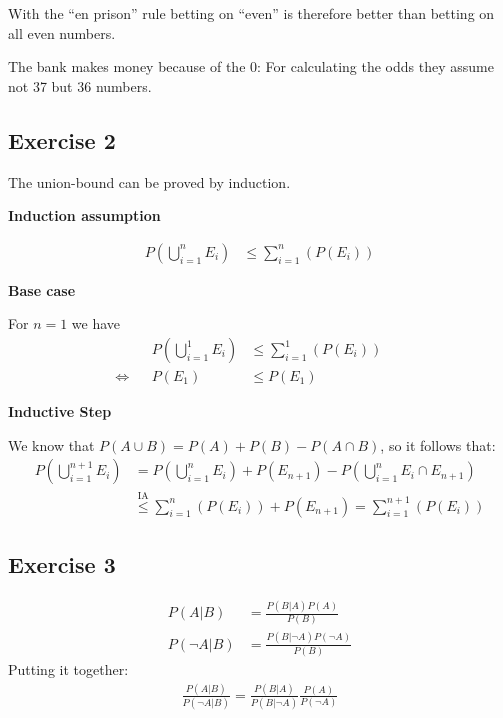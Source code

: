 With the ``en prison'' rule betting on ``even'' is therefore better than betting on all even numbers.

\bigskip

The bank makes money because of the $0$: For calculating the odds they assume not 37 but 36 numbers.


\subsection*{Exercise 2}
\setcounter{equation}{0}
The union-bound can be proved by induction.

\bigskip

\begin{samepage}
\textbf{Induction assumption}

\begin{align}
& & P\left(\bigcup\limits_{i=1}^{n}E_i\right) & \leq \sum\limits_{i=1}^{n}(P(E_i)) & &
\end{align}
\end{samepage}

\begin{samepage}
\textbf{Base case}

For $n=1$ we have
\begin{align}
& & P\left(\bigcup\limits_{i=1}^{1}E_i\right) & \leq \sum\limits_{i=1}^{1}(P(E_i)) & & \\
\Leftrightarrow & & P(E_1) & \leq P(E_1) & & 
\end{align}
\end{samepage}

\begin{samepage}
\textbf{Inductive Step}

We know that $P(A \cup B) = P(A) + P(B) - P(A \cap B)$, so it follows that:
\begin{align}
P\left(\bigcup\limits_{i=1}^{n+1}E_i\right) &= P\left(\bigcup\limits_{i=1}^{n}E_i\right) + P(E_{n+1}) - P\left(\bigcup\limits_{i=1}^{n}E_i \cap E_{n+1}\right) \\
                                            &\stackrel{\text{IA}}{\leq} \sum\limits_{i=1}^{n}(P(E_i)) + P(E_{n+1}) = \sum\limits_{i=1}^{n+1}(P(E_i))
\end{align}
\end{samepage}

\subsection*{Exercise 3}
\begin{align*}
P(A|B)      & = \frac{P(B|A)P(A)}{P(B)} \\
P(\neg A|B) & = \frac{P(B|\neg A)P(\neg A)}{P(B)}
\end{align*}
Putting it together:
\begin{align*}
\frac{P(A|B)}{P(\neg A|B)} = \frac{P(B|A)}{P(B|\neg A)} \frac{P(A)}{P(\neg A)}
\end{align*}

